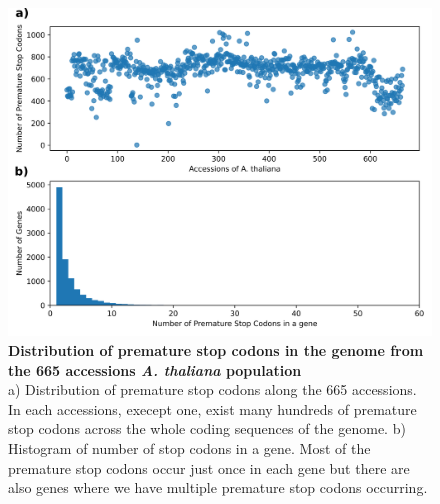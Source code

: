\begin{figure}[tb]
    \centering
    \begin{minipage}[h]{0.9\textwidth}
      \centering
      \includegraphics[width=1\textwidth]{images/Distribution_Premature_Stop_Codons.png}
      \caption[Distribution of premature stop codons in the genome from the 665 accessions \textit{A. thaliana} population]{\textbf{Distribution of premature stop codons in the genome from the 665 accessions \textit{A. thaliana} population}\\
      a) Distribution of premature stop codons along the 665 accessions. In each accessions, execept one, exist many hundreds of premature stop codons across the whole coding sequences of the genome. b) Histogram of number of stop codons in a gene. Most of the premature stop codons occur just once in each gene but there are also genes where we have multiple premature stop codons occurring. }
     \label{fig:Distribution_Premature_Stop_Codons_all}
    \end{minipage}
  \end{figure} 